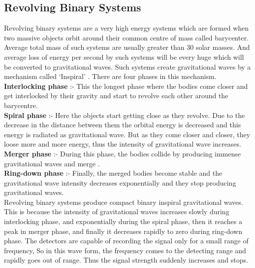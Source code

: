 \subsection{Revolving Binary Systems}

Revolving binary systems are a very high energy systems which are formed when two massive objects orbit around their common centre of mass called barycenter. Average total mass of such systems are usually greater than 30 solar masses. And average loss of energy per second by such systems will be every huge which will be converted to gravitational waves. Such systems create gravitational waves by a mechanism called `Inspiral' \cite{van_der_Sluys_2008}. There are four phases in this mechanism. \\

\textbf{Interlocking phase} :- This the longest phase where the bodies come closer and get interlocked by their gravity and start to revolve each other around the barycentre. \\

\textbf{Spiral phase} :- Here the objects start getting close as they revolve. Due to the decrease in the distance between them the orbital energy is decreased and this energy is radiated as gravitational wave. But as they come closer and closer, they loose more and more energy, thus the intensity of gravitational wave increases.\\

\textbf{Merger phase} :- During this phase, the bodies collide by producing immense gravitational waves and merge \cite{article}. \\

\textbf{Ring-down phase} :- Finally, the merged bodies become stable and the gravitational wave intensity decreases exponentially and they stop producing gravitational waves. \\

Revolving binary systems produce compact binary inspiral gravitational waves. This is because the intensity of gravitational waves increases slowly during interlocking phase, and exponentially during the spiral phase, then it reaches a peak in merger phase, and finally it decreases rapidly to zero during ring-down phase. The detectors are capable of recording the signal only for a small range of frequency, So in this wave form, the frequency comes to the detecting range and rapidly goes out of range. Thus the signal strength suddenly increases and stops.

